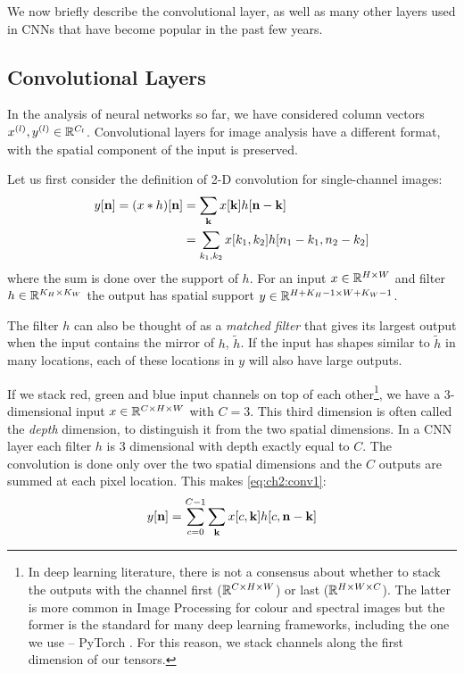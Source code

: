 We now briefly describe the convolutional layer, as well as many other layers
used in CNNs that have become popular in the past few years.

\subsection{Convolutional Layers}\label{sec:ch2:conv_layers}
In the analysis of neural networks so far, we have considered column vectors
$x^{(l)},y^{(l)} \in \reals[C_{l}]$. Convolutional layers for image analysis
have a different format, with the spatial component of the input is
preserved.

Let us first consider the definition of 2-D convolution for single-channel
images:
\begin{align}
  y[\nn] = (x\conv h)[\nn] &= \sum_{\kk} x[\kk]h[\nn-\kk] \label{eq:ch2:conv1}\\
                           &= \sum_{k_1, k_2} x[k_1,k_2]h[n_1-k_1, n_2-k_2]
\end{align}
where the sum is done over the support of $h$. For an input $x\in \reals[H\x W]$
and filter $h\in \reals[K_H\x K_W]$ the output has spatial support $y\in
\reals[H+K_H-1 \x W+K_W-1]$.

The filter $h$ can also be thought of as a \emph{matched filter}
that gives its largest output when the input contains the mirror of $h$, $\tilde{h}$. If the input has
shapes similar to $\tilde{h}$ in many locations, each of these locations in $y$ will
also have large outputs.

If we stack red, green and blue input channels on top of each other\footnote{In deep
learning literature, there is not a consensus about whether to stack the outputs
with the channel first ($\reals[C\x H\x W]$) or last ($\reals[H\x W\x C]$). The
latter is more common in Image Processing for colour and spectral images but
the former is the standard for many deep learning frameworks, including the one
we use -- PyTorch \cite{paszke_automatic_2017}. For this reason, we stack
channels along the first dimension of our tensors.}, we have a
3-dimensional input $x \in \reals[C\x H\x W]$ with $C=3$.
This third dimension is often called the \emph{depth} dimension, to distinguish
it from the two spatial dimensions. In a CNN layer each filter $h$ is 3
dimensional with depth exactly equal to $C$. The convolution is
done only over the two spatial dimensions
and the $C$ outputs are summed at each pixel location. This makes
\eqref{eq:ch2:conv1}:
\begin{equation}
  y[\nn] = \sum_{c=0}^{C-1} \sum_{\kk} x[c, \kk]h[c, \nn-\kk]
  \label{eq:ch2:conv2}
\end{equation}

